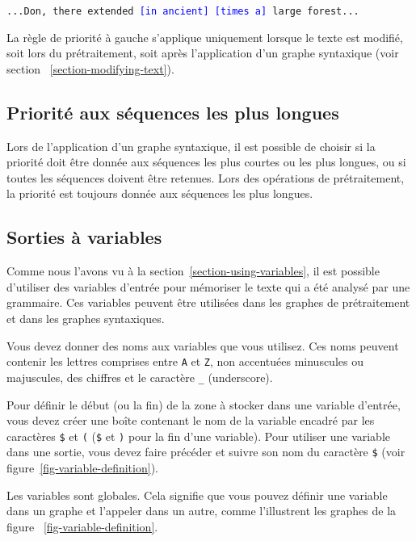 \begin{center}
\texttt{...Don, there extended \textcolor{blue}{[in ancient] [times a]} large forest...}
\end{center}

\noindent La règle de priorité à gauche s’applique uniquement lorsque le texte est modifié, soit lors
du prétraitement, soit après l’application d’un graphe syntaxique (voir section 
~\ref{section-modifying-text}).

\subsection{Priorité aux séquences les plus longues}
Lors de l’application d’un graphe syntaxique, il est possible de choisir si la priorité doit
être donnée aux séquences les plus courtes ou les plus longues, ou si toutes les séquences
doivent être retenues. Lors des opérations de prétraitement, la priorité est toujours donnée
aux séquences les plus longues.


\subsection{Sorties à variables}
\label{section-variables}
Comme nous l’avons vu à la section~\ref{section-using-variables}, il est possible d’utiliser
des variables d'entrée pour mémoriser le texte qui a été analysé par une grammaire. Ces variables
peuvent être utilisées dans les graphes de prétraitement et dans les graphes syntaxiques.


\bigskip
\noindent Vous devez donner des noms aux variables que vous utilisez. Ces noms peuvent contenir
les lettres comprises entre \verb+A+ et \verb+Z+, non accentuées minuscules ou majuscules, 
des chiffres et le caractère \verb+_+ (underscore).

\bigskip
\noindent Pour définir le début (ou la fin) de la zone à stocker dans une variable d'entrée, vous devez créer
une boîte contenant le nom de la variable encadré par les caractères
\verb-$- et \verb-(- (\verb-$- et \verb-)- pour la fin d’une variable). Pour utiliser une variable
dans une sortie, vous devez faire précéder et suivre son nom du caractère \verb-$- (voir figure~\ref{fig-variable-definition}).

\bigskip
\noindent Les variables sont globales. Cela signifie que vous pouvez définir une variable dans un
graphe et l’appeler dans un autre, comme l’illustrent les graphes de la figure
~\ref{fig-variable-definition}.

